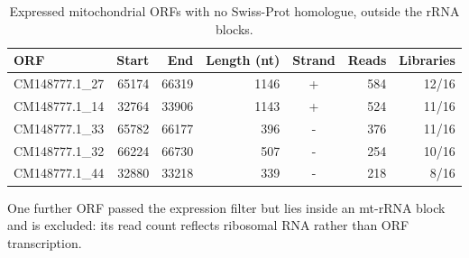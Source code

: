 \begin{table}[htbp]
\caption{Expressed mitochondrial ORFs with no Swiss-Prot homologue, outside the rRNA blocks.}\label{tab:orfs}
\footnotesize
\begin{tabular}{@{}lrrrcrr@{}}
\toprule
ORF & Start & End & Length (nt) & Strand & Reads & Libraries \\
\midrule
CM148777.1\_27 & 65174 & 66319 & 1146 & + & 584 & 12/16 \\
CM148777.1\_14 & 32764 & 33906 & 1143 & + & 524 & 11/16 \\
CM148777.1\_33 & 65782 & 66177 & 396 & - & 376 & 11/16 \\
CM148777.1\_32 & 66224 & 66730 & 507 & - & 254 & 10/16 \\
CM148777.1\_44 & 32880 & 33218 & 339 & - & 218 & 8/16 \\
\bottomrule
\end{tabular}
\begin{tablenotes}[flushleft]\footnotesize\item One further ORF passed the expression filter but lies inside an mt-rRNA block and is excluded: its read count reflects ribosomal RNA rather than ORF transcription.\end{tablenotes}
\end{table}
